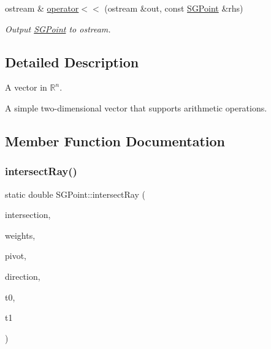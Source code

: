 \begin{DoxyCompactItemize}
\mbox{\label{classSGPoint_a574625ffb8acdf3d4fbd94e9c8bac123}} 
ostream \& \hyperlink{classSGPoint_a574625ffb8acdf3d4fbd94e9c8bac123}{operator$<$$<$} (ostream \&out, const \hyperlink{classSGPoint}{S\+G\+Point} \&rhs)
\begin{DoxyCompactList}\small\item\em Output \hyperlink{classSGPoint}{S\+G\+Point} to ostream. \end{DoxyCompactList}\end{DoxyCompactItemize}


\subsection{Detailed Description}
A vector in $\mathbb{R}^n$. 

A simple two-\/dimensional vector that supports arithmetic operations. 

\subsection{Member Function Documentation}
\mbox{\label{classSGPoint_a81992734a4de046226d60b3df576bbb6}} 
\subsubsection{\texorpdfstring{intersect\+Ray()}{intersectRay()}}
{\footnotesize\ttfamily static double S\+G\+Point\+::intersect\+Ray (\begin{DoxyParamCaption}\item[{\hyperlink{classSGPoint}{S\+G\+Point} \&}]{intersection,  }\item[{\hyperlink{classSGPoint}{S\+G\+Point} \&}]{weights,  }\item[{const \hyperlink{classSGPoint}{S\+G\+Point} \&}]{pivot,  }\item[{const \hyperlink{classSGPoint}{S\+G\+Point} \&}]{direction,  }\item[{const \hyperlink{classSGPoint}{S\+G\+Point} \&}]{t0,  }\item[{const \hyperlink{classSGPoint}{S\+G\+Point} \&}]{t1 }\end{DoxyParamCaption})\hspace{0.3cm}{\ttfamily [static]}}



